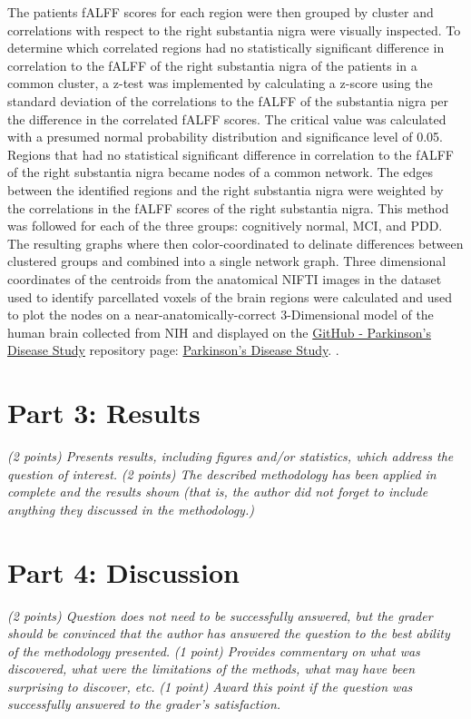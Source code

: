 \documentclass[12pt]{article}
\begin{document}
The patients fALFF scores for each region were then grouped by cluster and correlations with respect to the right substantia nigra were visually inspected. To determine which correlated regions had no statistically significant difference in correlation to the fALFF of the right substantia nigra of the patients in a common cluster, a z-test was implemented by calculating a z-score using the standard deviation of the correlations to the fALFF of the substantia nigra per the difference in the correlated fALFF scores. The critical value was calculated with a presumed normal probability distribution and significance level of 0.05. Regions that had no statistical significant difference in correlation to the fALFF of the right substantia nigra became nodes of a common network. The edges between the identified regions and the right substantia nigra were weighted by the correlations in the fALFF scores of the right substantia nigra. This method was followed for each of the three groups: cognitively normal, MCI, and PDD. The resulting graphs where then color-coordinated to delinate differences between clustered groups and combined into a single network graph. Three dimensional coordinates of the centroids from the anatomical NIFTI images in the dataset used to identify parcellated voxels of the brain regions were calculated and used to plot the nodes on a near-anatomically-correct 3-Dimensional model of the human brain collected from NIH \cite{NIH3DPX021161} and displayed on the \href{https://github.com/efwoods/Parkinson_Disease_Study}{GitHub - Parkinson's Disease Study} repository page: \href{https://efwoods.github.io/Parkinsons_Disease_Study/}{Parkinson's Disease Study}. \cite{WoodsParkinsonsStudy}.

\section{Part 3: Results}
\textit{(2 points) Presents results, including figures and/or statistics, which address the question of interest.}
\textit{(2 points) The described methodology has been applied in complete and the results shown (that is, the author did not forget to include anything they discussed in the methodology.) }




\section{Part 4: Discussion}
\textit{(2 points) Question does not need to be successfully answered, but the grader should be convinced that the author has answered the question to the best ability of the methodology presented.}
\textit{(1 point) Provides commentary on what was discovered, what were the limitations of the methods, what may have been surprising to discover, etc.}
\textit{(1 point) Award this point if the question was successfully answered to the grader's satisfaction. }
\end{document}
